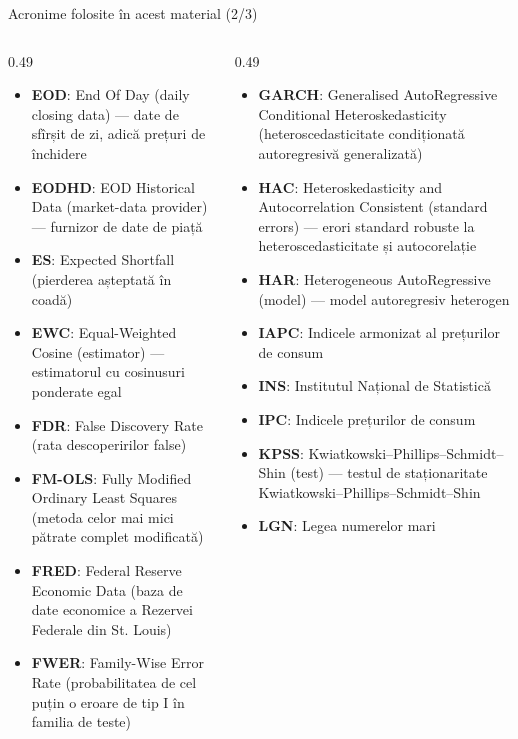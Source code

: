 \begin{frame}{Acronime folosite în acest material (2/3)}
\begin{columns}[T]
\begin{column}{0.49\textwidth}
\begin{itemize}\setlength{\itemsep}{0pt}
    \item \textbf{EOD}: End Of Day (daily closing data) — date de sfîrșit de zi, adică prețuri de închidere
    \item \textbf{EODHD}: EOD Historical Data (market-data provider) — furnizor de date de piață
    \item \textbf{ES}: Expected Shortfall (pierderea așteptată în coadă)
    \item \textbf{EWC}: Equal-Weighted Cosine (estimator) — estimatorul cu cosinusuri ponderate egal
    \item \textbf{FDR}: False Discovery Rate (rata descoperirilor false)
    \item \textbf{FM-OLS}: Fully Modified Ordinary Least Squares (metoda celor mai mici pătrate complet modificată)
    \item \textbf{FRED}: Federal Reserve Economic Data (baza de date economice a Rezervei Federale din St. Louis)
    \item \textbf{FWER}: Family-Wise Error Rate (probabilitatea de cel puțin o eroare de tip I în familia de teste)
\end{itemize}
\end{column}
\begin{column}{0.49\textwidth}
\begin{itemize}\setlength{\itemsep}{0pt}
    \item \textbf{GARCH}: Generalised AutoRegressive Conditional Heteroskedasticity (heteroscedasticitate condiționată autoregresivă generalizată)
    \item \textbf{HAC}: Heteroskedasticity and Autocorrelation Consistent (standard errors) — erori standard robuste la heteroscedasticitate și autocorelație
    \item \textbf{HAR}: Heterogeneous AutoRegressive (model) — model autoregresiv heterogen
    \item \textbf{IAPC}: Indicele armonizat al prețurilor de consum
    \item \textbf{INS}: Institutul Național de Statistică
    \item \textbf{IPC}: Indicele prețurilor de consum
    \item \textbf{KPSS}: Kwiatkowski–Phillips–Schmidt–Shin (test) — testul de staționaritate Kwiatkowski–Phillips–Schmidt–Shin
    \item \textbf{LGN}: Legea numerelor mari
\end{itemize}
\end{column}
\end{columns}
\end{frame}
